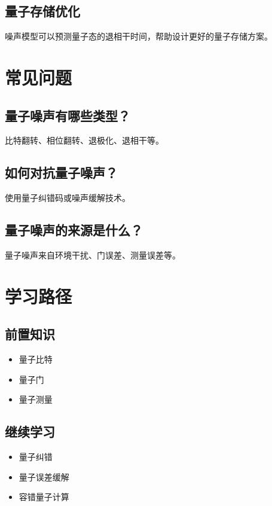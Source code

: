 \documentclass[12pt,a4paper]{article}
\begin{document}
\subsection{量子存储优化}

噪声模型可以预测量子态的退相干时间，帮助设计更好的量子存储方案。

\section{常见问题}

\subsection{量子噪声有哪些类型？}

比特翻转、相位翻转、退极化、退相干等。

\subsection{如何对抗量子噪声？}

使用量子纠错码或噪声缓解技术。

\subsection{量子噪声的来源是什么？}

量子噪声来自环境干扰、门误差、测量误差等。

\section{学习路径}

\subsection{前置知识}
\begin{itemize}
  \item 量子比特
  \item 量子门
  \item 量子测量
\end{itemize}

\subsection{继续学习}
\begin{itemize}
  \item 量子纠错
  \item 量子误差缓解
  \item 容错量子计算
\end{itemize}
\end{document}
